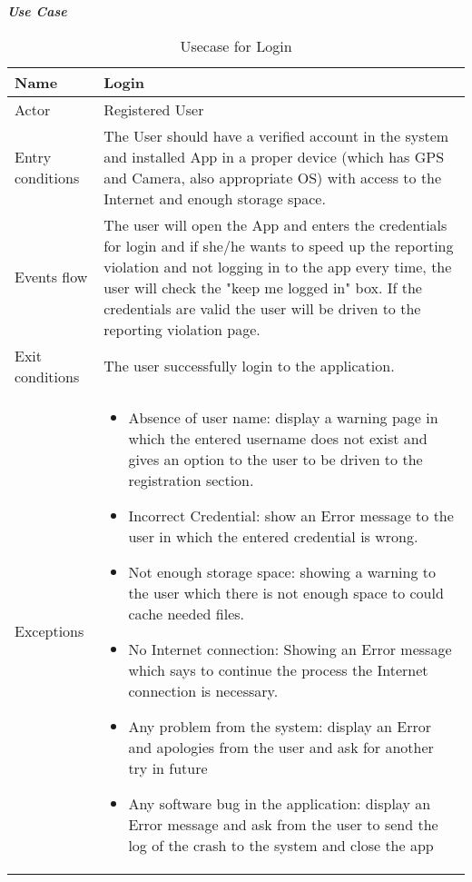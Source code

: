 \begin{table}[H]
\begin{flushleft}\emph{\textbf{Use Case}}\end{flushleft}
\footnotesize
\centering
\settowidth{}
\setlength\extrarowheight{2pt}
\begin{tabulary}{\textwidth}{|J|J|}
\hline
Name             & Login \\
\hline
Actor            & Registered User \\
\hline
Entry conditions & The User should have a verified account in the system and installed App in a proper device (which has GPS and Camera, also appropriate OS) with access to the Internet and enough storage space.\\
\hline 
Events flow      & The user will open the App and enters the credentials for login and if she/he wants to speed up the reporting violation and not logging in to the app every time, the user will check the "keep me logged in" box. If the credentials are valid the user will be driven to the reporting violation page.\\
\hline 
Exit conditions  & The user successfully login to the application.\\
\hline 
Exceptions       & 
\begin{minipage}[t]{0.8\textwidth}
\begin{itemize} 
\item Absence of user name: display a warning page in which the entered username does not exist and gives an option to the user to be driven to the registration section.
\item Incorrect Credential: show an Error message to the user in which the entered credential is wrong.
\item Not enough storage space: showing a warning to the user which there is not enough space to could cache needed files.
\item No Internet connection: Showing an Error message which says to continue the process the Internet connection is necessary.
\item Any problem from the system: display an Error and apologies from the user and ask for another try in future
\item Any software bug in the application: display an Error message and ask from the user to send the log of the crash to the system and close the app
\end{itemize}
\end{minipage}\\
\hline
\end{tabulary}
\caption{\label{tab:Usecase-Login}Usecase for Login}
\end{table}

